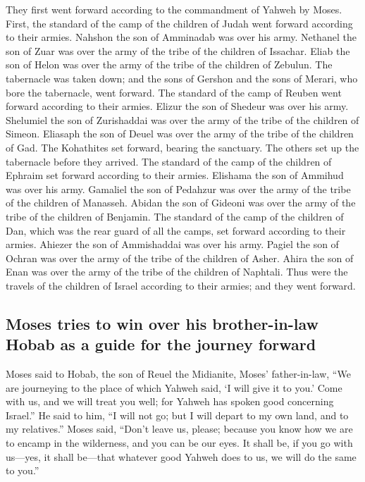  They first went forward according to the commandment of
Yahweh by Moses.  First, the standard of the camp of the
children of Judah went forward according to their armies. Nahshon the
son of Amminadab was over his army.  Nethanel the son of
Zuar was over the army of the tribe of the children of Issachar.
 Eliab the son of Helon was over the army of the tribe of
the children of Zebulun.  The tabernacle was taken down;
and the sons of Gershon and the sons of Merari, who bore the tabernacle,
went forward.  The standard of the camp of Reuben went
forward according to their armies. Elizur the son of Shedeur was over
his army.  Shelumiel the son of Zurishaddai was over the
army of the tribe of the children of Simeon.  Eliasaph
the son of Deuel was over the army of the tribe of the children of Gad.
 The Kohathites set forward, bearing the sanctuary. The
others set up the tabernacle before they arrived.  The
standard of the camp of the children of Ephraim set forward according to
their armies. Elishama the son of Ammihud was over his army.
 Gamaliel the son of Pedahzur was over the army of the
tribe of the children of Manasseh.  Abidan the son of
Gideoni was over the army of the tribe of the children of Benjamin.
 The standard of the camp of the children of Dan, which
was the rear guard of all the camps, set forward according to their
armies. Ahiezer the son of Ammishaddai was over his army.
 Pagiel the son of Ochran was over the army of the tribe
of the children of Asher.  Ahira the son of Enan was over
the army of the tribe of the children of Naphtali.  Thus
were the travels of the children of Israel according to their armies;
and they went forward.

\hypertarget{moses-tries-to-win-over-his-brother-in-law-hobab-as-a-guide-for-the-journey-forward}{%
\subsection{Moses tries to win over his brother-in-law Hobab as a guide
for the journey
forward}\label{moses-tries-to-win-over-his-brother-in-law-hobab-as-a-guide-for-the-journey-forward}}

 Moses said to Hobab, the son of Reuel the Midianite,
Moses' father-in-law, ``We are journeying to the place of which Yahweh
said, `I will give it to you.' Come with us, and we will treat you well;
for Yahweh has spoken good concerning Israel.''  He said
to him, ``I will not go; but I will depart to my own land, and to my
relatives.''  Moses said, ``Don't leave us, please;
because you know how we are to encamp in the wilderness, and you can be
our eyes.  It shall be, if you go with us---yes, it shall
be---that whatever good Yahweh does to us, we will do the same to you.''

